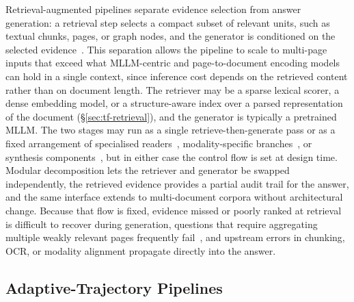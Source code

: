 \documentclass[11pt]{article}
\begin{document}
Retrieval-augmented pipelines separate evidence selection from answer generation: a retrieval step selects a compact subset of relevant units, such as textual chunks, pages, or graph nodes, and the generator is conditioned on the selected evidence~\cite{cho2024m3docrag,tanaka2025vdocrag}. This separation allows the pipeline to scale to multi-page inputs that exceed what MLLM-centric and page-to-document encoding models can hold in a single context, since inference cost depends on the retrieved content rather than on document length. The retriever may be a sparse lexical scorer, a dense embedding model, or a structure-aware index over a parsed representation of the document (\S\ref{sec:tf-retrieval}), and the generator is typically a pretrained MLLM. The two stages may run as a single retrieve-then-generate pass or as a fixed arrangement of specialised readers~\cite{han2025mdocagent}, modality-specific branches~\cite{suri2025visdom}, or synthesis components~\cite{duan2025m2rag}, but in either case the control flow is set at design time. Modular decomposition lets the retriever and generator be swapped independently, the retrieved evidence provides a partial audit trail for the answer, and the same interface extends to multi-document corpora without architectural change. Because that flow is fixed, evidence missed or poorly ranked at retrieval is difficult to recover during generation, questions that require aggregating multiple weakly relevant pages frequently fail~\cite{wu2025molorag}, and upstream errors in chunking, OCR, or modality alignment propagate directly into the answer.

\subsection{Adaptive-Trajectory Pipelines}
\label{sec:arch-agent}
\end{document}
